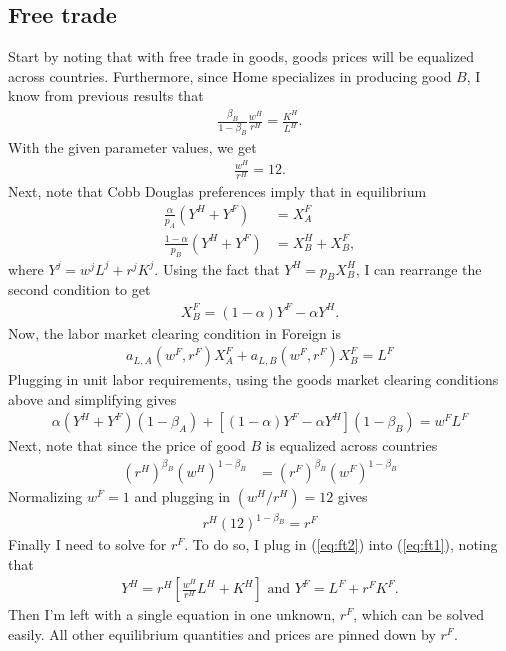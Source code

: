 \documentclass[12pt]{article}
\begin{document}
\subsection{Free trade}
Start by noting that with free trade in goods, goods prices will be equalized across countries. Furthermore, since Home specializes in producing good $B$, I know from previous results that 
\begin{align*}
\frac{\beta_B}{1-\beta_B} \frac{w^H}{r^H} = \frac{K^H}{L^H}.
\end{align*}
With the given parameter values, we get 
\begin{align*}
\frac{w^H}{r^H} = 12.
\end{align*}
Next, note that Cobb Douglas preferences imply that in equilibrium
\begin{align*}
\frac{\alpha}{p_A}(Y^H + Y^F) &= X^F_A \\
\frac{1-\alpha}{p_B}(Y^H + Y^F) &= X^H_B + X^F_B,
\end{align*}
where $Y^j = w^jL^j + r^jK^j$. Using the fact that $Y^H = p_B X^H_B$, I can rearrange the second condition to get
\begin{align*}
X_B^F = (1-\alpha)Y^F - \alpha Y^H.
\end{align*} 
Now, the labor market clearing condition in Foreign is
\begin{align*}
a_{L,A}(w^F,r^F)X_A^F + a_{L,B}(w^F,r^F)X_B^F = L^F
\end{align*}
Plugging in unit labor requirements, using the goods market clearing conditions above and simplifying gives
\begin{align}
\alpha(Y^H+ Y^F)(1-\beta_A)+[(1-\alpha)Y^F -\alpha Y^H](1-\beta_B)=w^FL^F \label{eq:ft1}
\end{align}
Next, note that since the price of good $B$ is equalized across countries
\begin{align*}
(r^H)^{\beta_B}(w^H)^{1-\beta_B} &=(r^F)^{\beta_B}(w^F)^{1-\beta_B} 
\end{align*}
Normalizing $w^F = 1$ and plugging in $(w^H/r^H) = 12$ gives
\begin{align}
r^H(12)^{1-\beta_B} = r^F \label{eq:ft2}
\end{align}
Finally I need to solve for $r^F$. To do so, I plug in (\ref{eq:ft2}) into (\ref{eq:ft1}), noting that
\begin{align*}
Y^H = r^H\left[\frac{w^H}{r^H}L^H + K^H\right] \text{ and } Y^F = L^F + r^FK^F.
\end{align*}
Then I'm left with a single equation in one unknown, $r^F$, which can be solved easily. All other equilibrium quantities and prices are pinned down by $r^F$.
\end{document}
